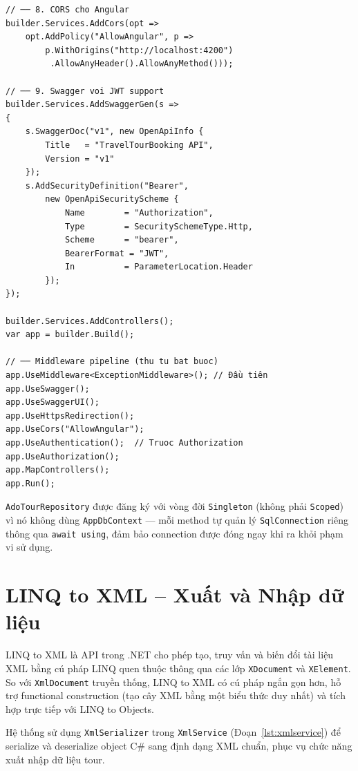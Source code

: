 \begin{lstlisting}[style=csharp,
  caption={Program.cs -- đăng ký DI đầy đủ của hệ thống},
  label={lst:di}]
// ── 8. CORS cho Angular
builder.Services.AddCors(opt =>
    opt.AddPolicy("AllowAngular", p =>
        p.WithOrigins("http://localhost:4200")
         .AllowAnyHeader().AllowAnyMethod()));

// ── 9. Swagger voi JWT support
builder.Services.AddSwaggerGen(s =>
{
    s.SwaggerDoc("v1", new OpenApiInfo {
        Title   = "TravelTourBooking API",
        Version = "v1"
    });
    s.AddSecurityDefinition("Bearer",
        new OpenApiSecurityScheme {
            Name        = "Authorization",
            Type        = SecuritySchemeType.Http,
            Scheme      = "bearer",
            BearerFormat = "JWT",
            In          = ParameterLocation.Header
        });
});

builder.Services.AddControllers();
var app = builder.Build();

// ── Middleware pipeline (thu tu bat buoc)
app.UseMiddleware<ExceptionMiddleware>(); // Đầu tiên
app.UseSwagger();
app.UseSwaggerUI();
app.UseHttpsRedirection();
app.UseCors("AllowAngular");
app.UseAuthentication();  // Truoc Authorization
app.UseAuthorization();
app.MapControllers();
app.Run();
\end{lstlisting}

\texttt{AdoTourRepository} được đăng ký với vòng đời
\texttt{Singleton} (không phải \texttt{Scoped}) vì nó không
dùng \texttt{AppDbContext} — mỗi method tự quản lý
\texttt{SqlConnection} riêng thông qua \texttt{await using},
đảm bảo connection được đóng ngay khi ra khỏi phạm vi sử dụng.

\section{LINQ to XML -- Xuất và Nhập dữ liệu}\label{Sec3.7}

LINQ to XML là API trong .NET cho phép tạo, truy vấn và biến
đổi tài liệu XML bằng cú pháp LINQ quen thuộc thông qua các
lớp \texttt{XDocument} và \texttt{XElement}. So với
\texttt{XmlDocument} truyền thống, LINQ to XML có cú pháp
ngắn gọn hơn, hỗ trợ functional construction (tạo cây XML
bằng một biểu thức duy nhất) và tích hợp trực tiếp với
LINQ to Objects.

Hệ thống sử dụng \texttt{XmlSerializer} trong
\texttt{XmlService} (Đoạn~\ref{lst:xmlservice}) để
serialize và deserialize object C\# sang định dạng XML
chuẩn, phục vụ chức năng xuất nhập dữ liệu tour.

